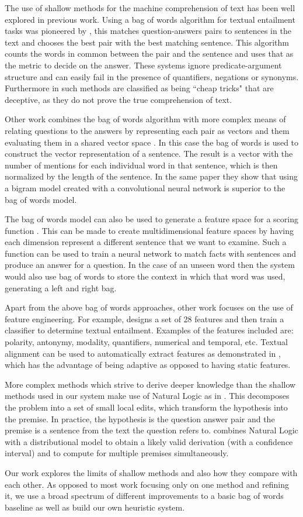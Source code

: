 The use of shallow methods for the machine comprehension of text has been well explored in previous work. Using a bag of words algorithm for textual entailment tasks was pioneered by \cite{deepread}, this matches question-answers pairs to sentences in the text and chooses the best pair with the best matching sentence. This algorithm counts the words in common between the pair and the sentence and uses that as the metric to decide on the answer. These systems ignore predicate-argument structure and can easily fail in the presence of quantifiers, negations or synonyms. Furthermore in  such methods are classified as being ``cheap tricks" that are deceptive, as they do not prove the true comprehension of text.

Other work combines the bag of words algorithm with more complex means of relating questions to the answers by representing each pair as vectors and them evaluating them in a shared vector space \cite{deep_selection}. In this case the bag of words is used to construct the vector representation of a sentence. The result is a vector with the number of mentions for each individual word in that sentence, which is then normalized by the length of the sentence. In the same paper they show that using a bigram model created with a convolutional neural network is superior to the bag of words model.

The bag of words model can also be used to generate a feature space for a scoring function \cite{memory_networks}. This can be made to create multidimensional feature spaces by having each dimension represent a different sentence that we want to examine. Such a function can be used to train a neural network to match facts with sentences and produce an answer for a question. In the case of an unseen word then the system would also use bag of words to store the context in which that word was used, generating a left and right bag.  

Apart from the above bag of words approaches, other work focuses on the use of feature engineering. For example,  designs a set of 28 features and then train a classifier to determine textual entailment. Examples of the features included are: polarity, antonymy, modality, quantifiers, numerical and temporal, etc. Textual alignment can be used to automatically extract features as demonstrated in \cite{relation_alignment}, which has the advantage of being adaptive as opposed to having static features. 

More complex methods which strive to derive deeper knowledge than the shallow methods used in our system make use of Natural Logic as in \cite{mccartney2007manning}. This decomposes the problem into a set of small local edits, which transform the hypothesis into the premise. In practice, the hypothesis is the question answer pair and the premise is a sentence from the text the question refers to.  combines Natural Logic with a distributional model to obtain a likely valid derivation (with a confidence interval) and to compute for multiple premises simultaneously. 

Our work explores the limits of shallow methods and also how they compare with each other. As opposed to most work focusing only on one method and refining it, we use a broad spectrum of different improvements to a basic bag of words baseline as well as build our own heuristic system. 